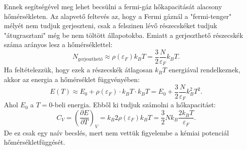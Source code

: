 \documentclass[../main.tex]{subfiles}
\begin{document}
Ennek segítségével meg lehet becsülni a fermi-gáz hőkapacitását alacsony hőmérsékleten. Az alapvető feltevés az, hogy a Fermi gáznál a "fermi-tenger" mélyét nem tudjuk gerjeszteni,
csak a felszinen lévő részecskéket tudjuk "átugrasztani" még be nem töltött állapotokba. Emiatt a gerjeszthető részecskék száma arányos lesz a hőmérséklettel:
\begin{equation}
    N_{\text{gerjeszthető}} \approx \rho(\varepsilon_F) k_B T = \frac{3}{2} \frac{N}{\varepsilon_F} k_B T.
\end{equation}
Ha feltételezzük, hogy ezek a részecskék átlagosan $k_B T$ energiával rendelkeznek, akkor az energia a hőmérséklet függvényében:
\begin{equation}
    E(T) \approx  E_0 + \rho(\varepsilon_F) \cdot k_B T \cdot k_B T = E_0 + \frac{3}{2} \frac{N}{\varepsilon_F} k^2_B T^2.
\end{equation}
Ahol $E_0$ a $T=0$-beli energia. Ebből ki tudjuk számolni a hőkapacitást:
\begin{equation}
    C_V = \left( \frac{\partial E}{\partial T} \right)_V = k_B 2 \rho(\varepsilon_F) k_B T = \frac{3}{2} N k_B \frac{2 k_B T}{\varepsilon_F}.
\end{equation}
De ez csak egy naív becslés, mert nem vettük figyelembe a kémiai potenciál hőmérsékletfüggését. 
\end{document}
